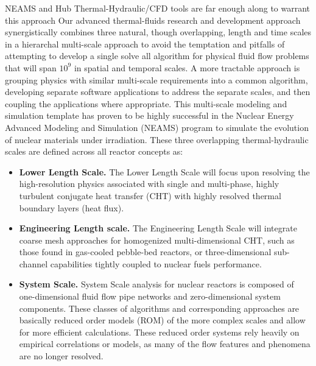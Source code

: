 NEAMS and Hub Thermal-Hydraulic/CFD tools are far enough along to warrant this approach
Our advanced thermal-fluids research and development approach synergistically combines three natural,
though overlapping, length and time scales in a hierarchal multi-scale approach to avoid the temptation and
pitfalls of attempting to develop a single solve all algorithm for physical fluid flow problems that will span $10^{9}$ in spatial and temporal scales. A more tractable approach is grouping physics with similar multi-scale requirements into a common algorithm, developing separate software applications to address the separate scales, and then coupling the applications where appropriate. This multi-scale modeling and simulation template has proven to be highly successful in the Nuclear Energy Advanced Modeling and Simulation (NEAMS) program to simulate the evolution of nuclear materials under irradiation. These three overlapping thermal-hydraulic scales are defined across all reactor concepts as:
\begin{itemize}
    \item \textbf{Lower Length Scale.} The Lower Length Scale will focus upon resolving the high-resolution physics
    associated with single and multi-phase, highly turbulent conjugate heat transfer (CHT) with highly
    resolved thermal boundary layers (heat flux).
    \item \textbf{Engineering Length scale.} The Engineering Length Scale will integrate coarse mesh approaches
    for homogenized multi-dimensional CHT, such as those found in gas-cooled pebble-bed reactors, or three-dimensional sub-channel capabilities tightly coupled to nuclear fuels performance.
    \item \textbf{System Scale.} System Scale analysis for nuclear reactors is composed of one-dimensional fluid flow
    pipe networks and zero-dimensional system components. These classes of algorithms and corresponding approaches are basically reduced order models (ROM) of the more complex scales and allow for more efficient calculations. These reduced order systems rely heavily on empirical correlations or models, as many of the flow features and phenomena are no longer resolved.
\end{itemize}

